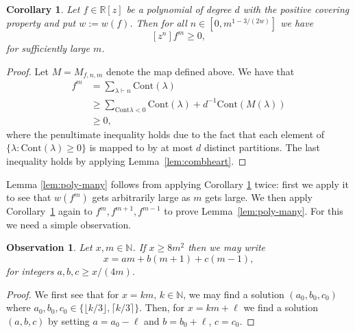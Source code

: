 \documentclass{daj}
\newcommand{\R}{\mathbb{R}}
\def\l{\lambda}
\def\N{\mathbb{N}}
\newcommand{\Cont}{\mathrm{Cont}}
\newtheorem{corollary}[theorem]{Corollary}
\newtheorem{observation}[theorem]{Observation}
\theoremstyle{definition}
\theoremstyle{remark}
\begin{document}
\begin{corollary}\label{cor:non-zero-small}
Let $f \in \R[z]$ be a polynomial of degree $d$ with the positive covering property and put $w := w(f)$. Then 
for all $n \in [0,m^{1-3/(2w)}]$ we have \[ [z^n]f^m \geq 0,\] for sufficiently large $m$.
\end{corollary}
\begin{proof}
Let $M = M_{f,n,m}$ denote the map defined above. We have that  
\begin{align*}
[z^n]f^m &= \sum_{\l \vdash n}  \Cont(\l) \\
 &\geq \sum_{\Cont{\l} < 0 } \Cont(\l) + d^{-1}\Cont(M(\l)) \\
 & \geq 0, 
\end{align*}
where the penultimate inequality holds due to the fact that each element of $\{ \l : \Cont(\l) \geq 0\}$ is mapped to by at most $d$ distinct partitions.
The last inequality holds by applying Lemma~\ref{lem:combheart}.
\end{proof}


Lemma \ref{lem:poly-many} follows from applying Corollary \ref{cor:non-zero-small} twice:  first we apply it to see that $w(f^m)$ gets arbitrarily large as $m$ gets large.  We then apply Corollary~\ref{cor:non-zero-small} again
to $ f^m, f^{m+1},f^{m-1}$ to prove Lemma~\ref{lem:poly-many}. For this we need a simple observation. 

\begin{observation}\label{obs:2}
Let $x,m \in \N$. If $x \geq 8m^2$ then we may write
\[ x = am + b(m+1) + c(m-1), \]
for integers $a,b,c \geq x/(4m)$.
\end{observation}
\begin{proof}
We first see that for $x = km$, $k \in \N$, we may find a solution $(a_0,b_0,c_0)$ where $a_0,b_0,c_0 \in \{\lfloor k/3 \rfloor, \lceil k/3 \rceil\}$.
Then, for $x = km + \ell$ we find a solution $(a,b,c)$ by setting $a = a_0 - \ell$ and $b = b_0+\ell$, $c = c_0$. 
\end{proof}
\end{document}
